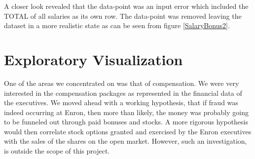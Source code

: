 \documentclass[twoside,openright,titlepage,numbers=noenddot,headinclude,%
               footinclude=true,cleardoublepage=empty,abstractoff,BCOR=5mm,%
               paper=a4,fontsize=11pt,ngerman,american]{scrreprt}
\numberwithin{theorem}{chapter}
\numberwithin{definition}{chapter}
\numberwithin{algorithm}{chapter}
\numberwithin{figure}{chapter}
\numberwithin{table}{chapter}
\numberwithin{equation}{chapter}
\begin{document}
 A closer look revealed that the data-point was an input error which included the TOTAL of all salaries as its own row. The data-point was removed leaving the dataset in a more realistic state as can be seen from figure \ref{SalaryBonus2}.




\section*{Exploratory Visualization}

One of the areas we concentrated on was that of compensation. We were very interested in the compensation packages as represented in the financial data of the executives. We moved ahead with a working hypothesis, that if fraud was indeed occurring at Enron, then more than likely, the money was probably going to be funneled out through paid bonuses and stocks. A more rigorous hypothesis would then correlate stock options granted and exercised by the Enron executives with the sales of the shares on the open market. However, such an investigation, is outside the scope of this project. 
\end{document}
